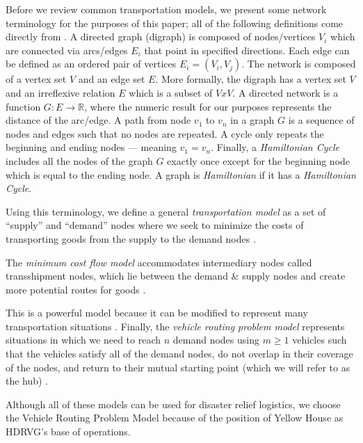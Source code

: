 \documentclass[11pt]{article}
\begin{document}
Before we review common transportation models, we present some network terminology for the purposes of this paper; all of the following definitions come directly from \cite{intro_graph_theory}.  A directed graph (digraph) is composed of nodes/vertices $V_{i}$ which are connected via arcs/edges $E_{i}$ that point in specified directions.  Each edge can be defined as an ordered pair of vertices $E_{i} = (V_{i},V_{j})$.  The network is composed of a vertex set $V$ and an edge set $E$.  More formally, the digraph has a vertex set $V$ and an irreflexive relation $E$ which is a subset of $VxV$.  A directed network is a function $G:E \rightarrow \mathbb{R}$, where the numeric result for our purposes represents the distance of the arc/edge. A path from node $v_{1}$ to $v_{n}$ in a graph $G$ is a sequence of nodes and edges such that no nodes are repeated. A cycle only repeats the beginning and ending nodes --- meaning $v_{1} = v_{n}$. Finally, a \textit{Hamiltonian Cycle} includes all the nodes of the graph $G$ exactly once except for the beginning node which is equal to the ending node.  A graph is \textit{Hamiltonian} if it has a \textit{Hamiltonian Cycle}.

Using this terminology, we define a general \textit{transportation model} as a set of ``supply'' and ``demand'' nodes where we seek to minimize the costs of transporting goods from the supply to the demand nodes \cite{LPOR_textbook}.  

The \textit{minimum cost flow model} accommodates intermediary nodes called transshipment nodes, which lie between the demand \& supply nodes and create more potential routes for goods \cite{LPOR_textbook}. 

  
This is a powerful model because it can be modified to represent many transportation situations \cite{LPOR_textbook}. Finally, the \textit{vehicle routing problem model} represents situations in which we need to reach $n$ demand nodes using $m \geq 1$ vehicles such that the vehicles satisfy all of the demand nodes, do not overlap in their coverage of the nodes, and return to their mutual starting point (which we will refer to as the hub) \cite{intro_logistics_book,VRP_textbook,eksioglu2009vehicle}.  

Although all of these models can be used for disaster relief logistics, we choose the Vehicle Routing Problem Model because of the position of Yellow House as HDRVG's base of operations.  
\end{document}
